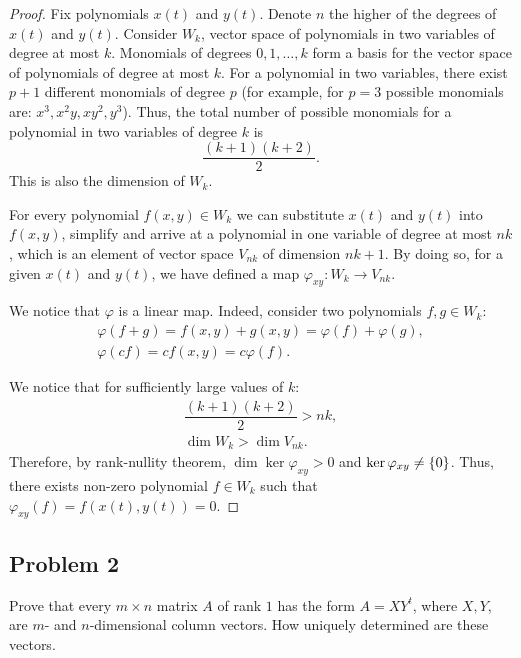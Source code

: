 \documentclass{article}
\theoremstyle{definition}
\DeclarePairedDelimiter\set{\{}{\}}
\begin{document}
\begin{proof}

Fix polynomials $x(t)$ and $y(t)$.
Denote $n$ the higher of the degrees of $x(t)$ and $y(t)$.
Consider $W_k$, vector space of polynomials in two variables of degree at most $k$.
Monomials of degrees $0,1,\dots,k$ form a basis for the vector space of polynomials of degree at most $k$.
For a polynomial in two variables, there exist $p+1$ different monomials of degree $p$ (for example, for $p=3$ possible monomials are: $x^3, x^2y, xy^2, y^3$).
Thus, the total number of possible monomials for a polynomial in two variables of degree $k$ is
\[ \dfrac{(k+1)(k+2)}{2}. \]
This is also the dimension of $W_k$.

For every polynomial $f(x,y) \in W_k$ we can substitute $x(t)$ and $y(t)$ into $f(x,y)$, simplify and arrive at a polynomial in one variable of degree at most $nk$, which is an element of vector space $V_{nk}$ of dimension $nk+1$.
By doing so, for a given $x(t)$ and $y(t)$, we have defined a map $\varphi_{xy} :  W_k \to V_{nk}$.

We notice that $\varphi$ is a linear map.
Indeed, consider two polynomials $f,g \in W_k$:
\begin{gather*}
    \varphi(f+g) = f(x,y) + g(x,y) = \varphi(f) + \varphi(g), \\
    \varphi(c f) = c f(x,y) = c \varphi(f).
\end{gather*}

We notice that for sufficiently large values of $k$:
\begin{gather*}
    \dfrac{(k+1)(k+2)}{2} > nk, \\
    \dim W_k > \dim V_{nk}.
\end{gather*}
Therefore, by rank-nullity theorem, $\dim \ker \varphi_{xy} > 0$ and $\ker \varphi_{xy} \neq \set{0}$.
Thus, there exists non-zero polynomial $f \in W_k$ such that $\varphi_{xy}(f) = f(x(t),y(t)) = 0$.

\end{proof}


\subsection*{Problem 2}

\begin{tcolorbox}
Prove that every $m \times n$ matrix $A$ of rank $1$ has the form $A = XY^t$, where $X, Y$, are $m$- and $n$-dimensional column vectors.
How uniquely determined are these vectors.
\end{tcolorbox}
\end{document}
